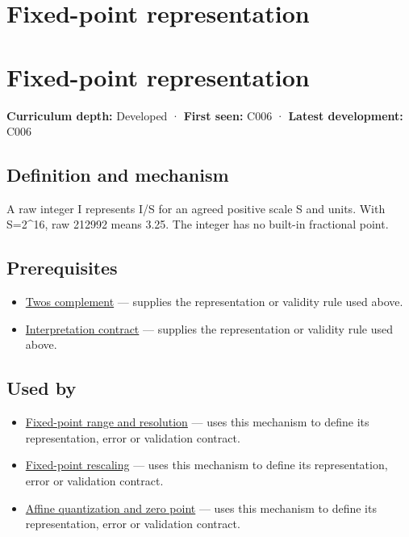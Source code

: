 \hypertarget{appendix-1d0dbe8924cc}{}
\section*{Fixed-point representation}
\section{Fixed-point representation}\label{fixed-point-representation}

\textbf{Curriculum depth:} Developed · \textbf{First seen:} C006 · \textbf{Latest development:} C006

\subsection{Definition and mechanism}\label{definition-and-mechanism}

A raw integer I represents I/S for an agreed positive scale S and units. With S=2\^{}16, raw 212992 means 3.25. The integer has no built-in fractional point.

\subsection{Prerequisites}\label{prerequisites}

\begin{itemize}
\tightlist
\item
  \hyperref[appendix-4fbc03d20829]{Two\textquotesingle s complement} --- supplies the representation or validity rule used above.
\item
  \hyperref[appendix-f414bd4ed05c]{Interpretation contract} --- supplies the representation or validity rule used above.
\end{itemize}

\subsection{Used by}\label{used-by}

\begin{itemize}
\tightlist
\item
  \hyperref[appendix-ceb4c4a9b5a1]{Fixed-point range and resolution} --- uses this mechanism to define its representation, error or validation contract.
\item
  \hyperref[appendix-3333db47830f]{Fixed-point rescaling} --- uses this mechanism to define its representation, error or validation contract.
\item
  \hyperref[appendix-d5da3eaabaef]{Affine quantization and zero point} --- uses this mechanism to define its representation, error or validation contract.
\end{itemize}

